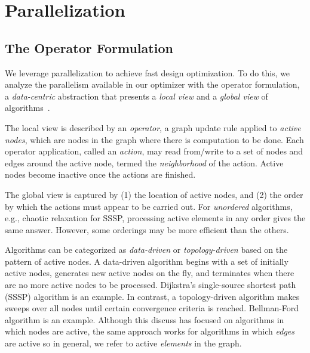 \section{Parallelization}
\label{sec:parallel}

\subsection{The Operator Formulation}

We leverage parallelization to achieve fast design optimization. To do this, we analyze the parallelism available in our optimizer with the operator formulation, a {\em data-centric} abstraction that presents a {\em local view} and a {\em global view} of algorithms~\cite{pingali11}.

The local view is described by an {\em operator}, a graph update rule applied to {\em active nodes}, which are nodes in the graph where there is computation to be done. Each operator application, called an {\em action}, may read from/write to a set of nodes and edges around the active node, termed the {\em neighborhood} of the action. Active nodes become inactive once the actions are finished.

The global view is captured by (1) the location of active nodes, and (2) the order by which the actions must appear to be carried out. For {\em unordered} algorithms, e.g., chaotic relaxation for SSSP, processing active elements in any order gives the same answer. However, some orderings may be more efficient than the others.


Algorithms can be categorized as {\em data-driven} or {\em topology-driven} based on the pattern of active nodes. A data-driven algorithm begins with a set of initially active nodes, generates new active nodes on the fly, and terminates when there are no more active nodes to be processed. Dijkstra's single-source shortest path (SSSP) algorithm is an example. In contrast, a topology-driven algorithm makes sweeps over all nodes until certain convergence criteria is reached. Bellman-Ford algorithm is an example. Although this discuss has focused on algorithms in which nodes are active, the same approach works for algorithms in which \emph{edges} are active so in general, we refer to active \emph{elements} in the graph.

